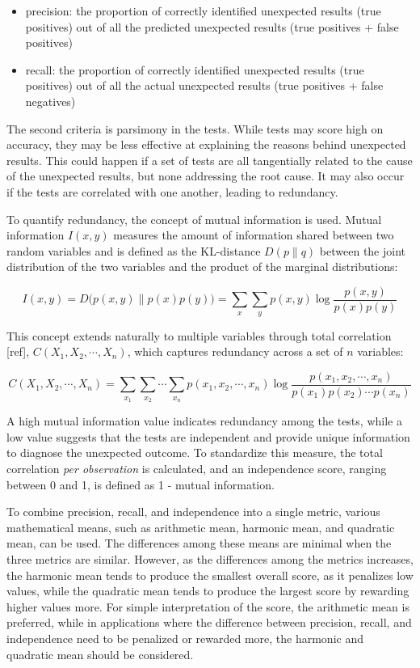 \documentclass[
]{jds}
\providecommand{\tightlist}{%
  \setlength{\itemsep}{0pt}\setlength{\parskip}{0pt}}\usepackage{longtable,booktabs,array}
\begin{document}
\begin{itemize}
\tightlist
\item
  precision: the proportion of correctly identified unexpected results
  (true positives) out of all the predicted unexpected results (true
  positives + false positives)
\item
  recall: the proportion of correctly identified unexpected results
  (true positives) out of all the actual unexpected results (true
  positives + false negatives)
\end{itemize}

The second criteria is parsimony in the tests. While tests may score
high on accuracy, they may be less effective at explaining the reasons
behind unexpected results. This could happen if a set of tests are all
tangentially related to the cause of the unexpected results, but none
addressing the root cause. It may also occur if the tests are correlated
with one another, leading to redundancy.

To quantify redundancy, the concept of mutual information is used.
Mutual information \(I(x, y)\) measures the amount of information shared
between two random variables and is defined as the KL-distance
\(D(p \parallel q)\) between the joint distribution of the two variables
and the product of the marginal distributions:

\[I(x,y) = D\big(p(x,y) \parallel p(x)p(y)\big) = \sum_x \sum_y p(x,y) \log \frac{p(x,y)}{p(x)p(y)}\]

This concept extends naturally to multiple variables through total
correlation {[}ref{]}, \(C(X_1, X_2, \cdots, X_n)\), which captures
redundancy across a set of \(n\) variables:

\[C(X_1, X_2, \cdots, X_n) = \sum_{x_1} \sum_{x_2} \cdots \sum_{x_n} p(x_1, x_2, \cdots, x_n) \log \frac{p(x_1, x_2, \cdots, x_n)}{p(x_1)p(x_2) \cdots p(x_n)}\]

A high mutual information value indicates redundancy among the tests,
while a low value suggests that the tests are independent and provide
unique information to diagnose the unexpected outcome. To standardize
this measure, the total correlation \emph{per observation} is
calculated, and an independence score, ranging between 0 and 1, is
defined as 1 - mutual information.

To combine precision, recall, and independence into a single metric,
various mathematical means, such as arithmetic mean, harmonic mean, and
quadratic mean, can be used. The differences among these means are
minimal when the three metrics are similar. However, as the differences
among the metrics increases, the harmonic mean tends to produce the
smallest overall score, as it penalizes low values, while the quadratic
mean tends to produce the largest score by rewarding higher values more.
For simple interpretation of the score, the arithmetic mean is
preferred, while in applications where the difference between precision,
recall, and independence need to be penalized or rewarded more, the
harmonic and quadratic mean should be considered.
\end{document}
